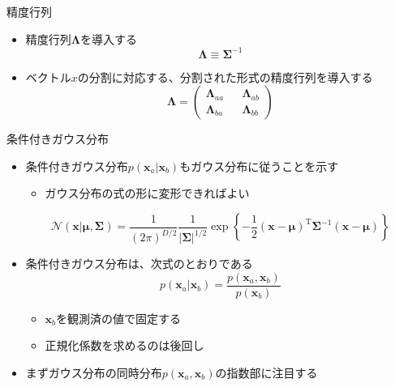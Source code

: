 \begin{frame}{精度行列}
 \begin{itemize}
  \item \alert{精度行列}$\bm{\Lambda}$を導入する
        \begin{equation}
         \bm{\Lambda} \equiv \bm{\Sigma}^{-1}
        \end{equation}

  \item ベクトル$x$の分割に対応する、分割された形式の精度行列を導入する
        \begin{equation}
         \bm{\Lambda}=
          \begin{pmatrix}
           \bm{\Lambda}_{aa} && \bm{\Lambda}_{ab}\\
           \bm{\Lambda}_{ba} && \bm{\Lambda}_{bb}
          \end{pmatrix}
        \end{equation}
 \end{itemize}
\end{frame}


\begin{frame}{条件付きガウス分布}
 \begin{itemize}
  \item 条件付きガウス分布$p(\bm{x}_a|\bm{x}_b)$もガウス分布に従うことを示す
        \begin{itemize}
         \item ガウス分布の式の形に変形できればよい
        \end{itemize}
        \begin{equation}
         \mathcal{N}(\bm{x}|\bm{\mu},\bm{\Sigma}) = \frac{1}{(2\pi)^{D/2}}\frac{1}{|\bm{\Sigma}|^{1/2}}\exp\left\{-\frac{1}{2}(\bm{x} - \bm{\mu})^{\mathrm{T}}\bm{\Sigma}^{-1}(\bm{x}-\bm{\mu})\right\}
        \end{equation}
  \item 条件付きガウス分布は、次式のとおりである
        \begin{equation}
         p(\bm{x}_a | \bm{x}_b) = \frac{p(\bm{x}_a, \bm{x}_b)}{p(\bm{x}_b)}
        \end{equation}
        \begin{itemize}
         \item $\bm{x}_b$を観測済の値で\alert{固定}する
         \item 正規化係数を求めるのは後回し
        \end{itemize}
  \item まずガウス分布の同時分布$p(\bm{x}_a,\bm{x}_b)$の指数部に注目する
 \end{itemize}
\end{frame}

